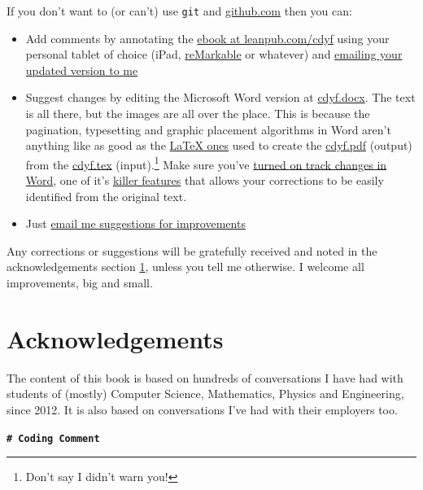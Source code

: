 \documentclass[
]{book}
\providecommand{\tightlist}{%
  \setlength{\itemsep}{0pt}\setlength{\parskip}{0pt}}
\begin{document}
If you don't want to (or can't) use \texttt{git} and \href{https://github.com/}{github.com} then you can:

\begin{itemize}
\tightlist
\item
  Add comments by annotating the \href{https://leanpub.com/cdyf}{ebook at leanpub.com/cdyf} using your personal tablet of choice (iPad, \href{https://en.wikipedia.org/wiki/ReMarkable}{reMarkable} or whatever) and \href{https://personalpages.manchester.ac.uk/staff/duncan.hull/contact.html}{emailing your updated version to me}
\item
  Suggest changes by editing the Microsoft Word version at \href{http://cdyf.me/cdyf.docx}{cdyf.docx}. The text is all there, but the images are all over the place. This is because the pagination, typesetting and graphic placement algorithms in Word aren't anything like as good as the \href{https://latex4year1.netlify.app/}{LaTeX ones} used to create the \href{https://leanpub.com/cdyf}{cdyf.pdf} (output) from the \href{https://github.com/dullhunk/cdyf/blob/master/_book/cdyf.tex}{cdyf.tex} (input).\footnote{Don't say I didn't warn you!} Make sure you've \href{https://support.microsoft.com/en-us/office/track-changes-in-word-197ba630-0f5f-4a8e-9a77-3712475e806a}{turned on track changes in Word}, one of it's \href{https://en.wikipedia.org/wiki/Killer_feature}{killer features} that allows your corrections to be easily identified from the original text.
\item
  Just \href{https://personalpages.manchester.ac.uk/staff/duncan.hull/contact.html}{email me suggestions for improvements}
\end{itemize}

Any corrections or suggestions will be gratefully received and noted in the acknowledgements section \ref{thanks}, unless you tell me otherwise. I welcome all improvements, big and small.

\hypertarget{thanks}{%
\section{Acknowledgements}\label{thanks}}

The content of this book is based on hundreds of conversations I have had with students of (mostly) Computer Science, Mathematics, Physics and Engineering, since 2012. It is also based on conversations I've had with their employers too.

\textbf{\texttt{\#\ Coding\ Comment}}
\end{document}
